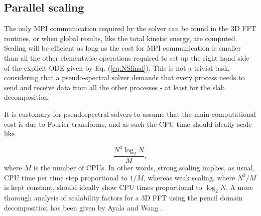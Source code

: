 \documentclass[11pt, oneside]{article}
\begin{document}
\subsection{Parallel scaling}
The only MPI communication required by the solver can be found in the 3D 
FFT routines, or when global results, like the total kinetic energy, are 
computed. Scaling will be efficient as long as the cost for MPI 
communication is smaller than all the other elementwise operations required 
to set up the right hand side of the explicit ODE given by Eq. 
(\ref{eq:NSfinal}). This is not a trivial task, considering that a pseudo-spectral solver demands that every process needs to send and receive data 
from all the other processes - at least for the slab decomposition.

It is customary for pseudospectral solvers to assume that the main computational cost is due to Fourier transforms, and as such the CPU time should ideally scale like

\begin{equation}
 \frac{N^3 \log_2 N}{M},
\end{equation}
where $M$ is the number of CPUs. In other words, strong scaling implies, as usual, CPU time per time step proportional to $1/M$, whereas weak scaling, where $N^3/M$ is kept constant, should ideally show CPU times proportional to $\log_2 N$. A more thorough analysis of scalability factors for a 3D FFT using the pencil domain decomposition has been given by Ayala and Wang \cite{ayala2013}.
\end{document}
